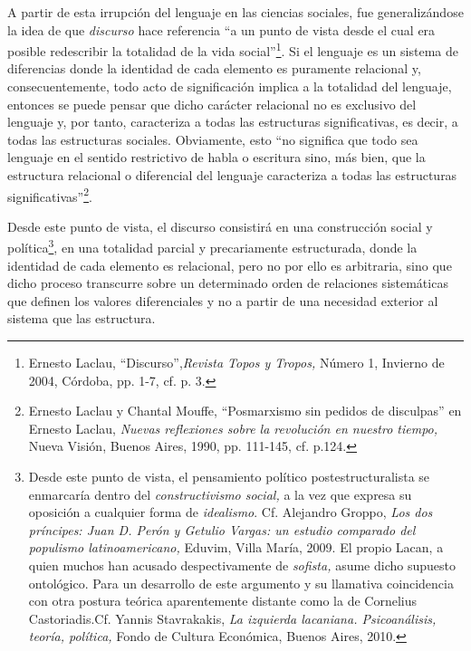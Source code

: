 A partir de esta irrupción del lenguaje en las ciencias sociales, fue generalizándose la idea de que \emph{discurso} hace referencia \enquote{a un punto de vista desde el cual era posible redescribir la totalidad de la vida social}\footnote{Ernesto Laclau, \enquote{Discurso},\emph{Revista Topos y Tropos,} Número 1, Invierno de 2004, Córdoba, pp. 1-7, cf. p. 3.}. Si el lenguaje es un sistema de diferencias donde la identidad de cada elemento es puramente relacional y, consecuentemente, todo acto de significación implica a la totalidad del lenguaje, entonces se puede pensar que dicho carácter relacional no es exclusivo del lenguaje y, por tanto, caracteriza a todas las estructuras significativas, es decir, a todas las estructuras sociales. Obviamente, esto \enquote{no significa que todo sea lenguaje en el sentido restrictivo de habla o escritura sino, más bien, que la estructura relacional o diferencial del lenguaje caracteriza a todas las estructuras significativas}\footnote{Ernesto Laclau y Chantal Mouffe, \enquote{Posmarxismo sin pedidos de disculpas} en Ernesto Laclau, \emph{Nuevas reflexiones sobre la revolución en nuestro tiempo,} Nueva Visión, Buenos Aires, 1990, pp. 111-145, cf. p.124.}.

Desde este punto de vista, el discurso consistirá en una construcción social y política\footnote{Desde este punto de vista, el pensamiento político postestructuralista se enmarcaría dentro del \emph{constructivismo social,} a la vez que expresa su oposición a cualquier forma de \emph{idealismo}. Cf. Alejandro Groppo, \emph{Los dos príncipes: Juan D. Perón y Getulio Vargas: un estudio comparado del populismo latinoamericano,} Eduvim, Villa María, 2009. El propio Lacan, a quien muchos han acusado despectivamente de \emph{sofista,} asume dicho supuesto ontológico. Para un desarrollo de este argumento y su llamativa coincidencia con otra postura teórica aparentemente distante como la de Cornelius Castoriadis.Cf. Yannis Stavrakakis, \emph{La izquierda lacaniana. Psicoanálisis, teoría, política,} Fondo de Cultura Económica, Buenos Aires, 2010.}, en una totalidad parcial y precariamente estructurada, donde la identidad de cada elemento es relacional, pero no por ello es arbitraria, sino que dicho proceso transcurre sobre un determinado orden de relaciones sistemáticas que definen los valores diferenciales y no a partir de una necesidad exterior al sistema que las estructura.

